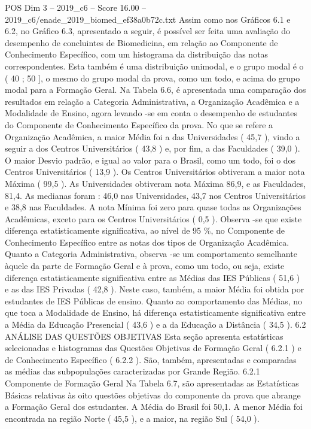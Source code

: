 \begin{textsample}{POS Dim 3 – 2019\_c6 – Score 16.00 – 2019\_c6/enade\_2019\_biomed\_ef38a0b72c.txt}
Assim como nos Gráficos 6.1 e 6.2, no Gráfico 6.3, apresentado a seguir, é possível ser feita uma avaliação do desempenho de concluintes de Biomedicina, em relação ao Componente de Conhecimento Específico, com um histograma da distribuição das notas correspondentes.
Esta também é uma distribuição unimodal, e o grupo modal é o ( 40 ; 50 ], o mesmo do grupo modal da prova, como um todo, e acima do grupo modal para a Formação Geral.
Na Tabela 6.6, é apresentada uma comparação dos resultados em relação a Categoria Administrativa, a Organização Acadêmica e a Modalidade de Ensino, agora levando -se em conta o desempenho de estudantes do Componente de Conhecimento Específico da prova.
No que se refere a Organização Acadêmica, a maior Média foi a das Universidades ( 45,7 ), vindo a seguir a dos Centros Universitários ( 43,8 ) e, por fim, a das Faculdades ( 39,0 ).
O maior Desvio padrão, e igual ao valor para o Brasil, como um todo, foi o dos Centros Universitários ( 13,9 ).
Os Centros Universitários obtiveram a maior nota Máxima ( 99,5 ).
As Universidades obtiveram nota Máxima 86,9, e as Faculdades, 81,4.
As medianas foram : 46,0 nas Universidades, 43,7 nos Centros Universitários e 38,8 nas Faculdades.
A nota Mínima foi zero para quase todas as Organizações Acadêmicas, exceto para os Centros Universitários ( 0,5 ).
Observa -se que existe diferença estatisticamente significativa, ao nível de 95 \%, no Componente de Conhecimento Específico entre as notas dos tipos de Organização Acadêmica.
Quanto a Categoria Administrativa, observa -se um comportamento semelhante àquele da parte de Formação Geral e à prova, como um todo, ou seja, existe diferença estatisticamente significativa entre as Médias das IES Públicas ( 51,6 ) e as das IES Privadas ( 42,8 ).
Neste caso, também, a maior Média foi obtida por estudantes de IES Públicas de ensino.
Quanto ao comportamento das Médias, no que toca a Modalidade de Ensino, há diferença estatisticamente significativa entre a Média da Educação Presencial ( 43,6 ) e a da Educação a Distância ( 34,5 ). 6.2 ANÁLISE DAS QUESTÕES OBJETIVAS Esta seção apresenta estatísticas selecionadas e histogramas das Questões Objetivas de Formação Geral ( 6.2.1 ) e de Conhecimento Específico ( 6.2.2 ).
São, também, apresentadas e comparadas as médias das subpopulações caracterizadas por Grande Região. 6.2.1 Componente de Formação Geral Na Tabela 6.7, são apresentadas as Estatísticas Básicas relativas às oito questões objetivas do componente da prova que abrange a Formação Geral dos estudantes.
A Média do Brasil foi 50,1.
A menor Média foi encontrada na região Norte ( 45,5 ), e a maior, na região Sul ( 54,0 ).

\end{textsample}
